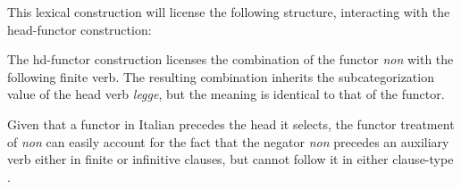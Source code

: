 \documentclass[output=paper]{langsci/langscibook}
\begin{document}
{\begin{exe}
\begin{xlist}
\begin{exe}
\begin{xlist}
This lexical construction will license the following structure, interacting
with the {\sc head-functor construction}:

\ea
{}
\z

%
\noindent
The {\sc hd-functor construction} licenses the combination
of the functor \emph{non} with the following finite verb. The resulting combination inherits the subcategorization value of the head
verb \emph{legge}, but the meaning is identical
to that of the functor.

Given that a functor in Italian precedes the head it selects,
the functor treatment of \emph{non} can easily account for the
fact that the negator \emph{non} precedes an auxiliary
verb either in finite or infinitive clauses, but cannot
follow it in either clause-type .




\eal
{}
\zl


\end{xlist}
\end{exe}
\end{xlist}
\end{exe}}
\end{document}
